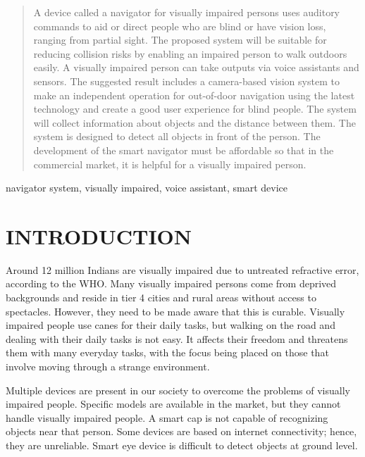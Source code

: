 \documentclass[conference]{IEEEtran}
\begin{document}
\maketitle

\begin{abstract}
A device called a navigator for visually impaired persons uses auditory commands to aid or direct people who are blind or have vision loss, ranging from partial sight. The proposed system will be suitable for reducing collision risks by enabling an impaired person to walk outdoors easily. A visually impaired person can take outputs via voice assistants and sensors. The suggested result includes a camera-based vision system to make an independent operation for out-of-door navigation using the latest technology and create a good user experience for blind people. The system will collect information about objects and the distance between them. The system is designed to detect all objects in front of the person. The development of the smart navigator must be affordable so that in the commercial market, it is helpful for a visually impaired person.
\end{abstract}

\begin{IEEEkeywords}
navigator system, visually impaired, voice assistant, smart device
\end{IEEEkeywords}

\section{INTRODUCTION}
Around 12 million Indians are visually impaired due to untreated refractive error, according to the WHO. Many visually impaired persons come from deprived backgrounds and reside in tier 4 cities and rural areas without access to spectacles. However, they need to be made aware that this is curable. Visually impaired people use canes for their daily tasks, but walking on the road and dealing with their daily tasks is not easy. It affects their freedom and threatens them with many everyday tasks, with the focus being placed on those that involve moving through a strange environment. 

Multiple devices are present in our society to overcome the problems of visually impaired people. Specific models are available in the market, but they cannot handle visually impaired people. A smart cap is not capable of recognizing objects near that person. Some devices are based on internet connectivity; hence, they are unreliable. Smart eye device is difficult to detect objects at ground level. 
\end{document}
